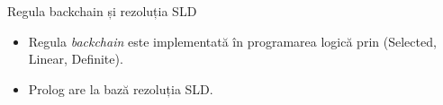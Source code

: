 \documentclass[xcolor=pdftex,romanian,colorlinks]{beamer}
\begin{document}
%
%
%
%
%
%


\begin{frame}{Regula {backchain} și rezoluția SLD}
\begin{itemize}
  \item Regula \textit{backchain} este implementată în programarea logică prin  (Selected, Linear, Definite).
  
  \medskip
  \item Prolog are la bază rezoluția SLD.
\end{itemize}
\end{frame}
\end{document}

